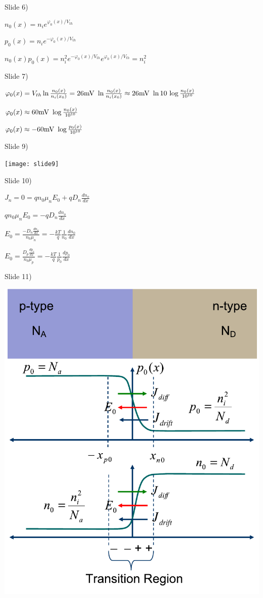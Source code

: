 \documentclass{beamer}
\begin{document}
 \begin{frame}{Slide 6)}

 ${n_0}(x) = {n_i}{e^{{\varphi _0}(x)/{V_{th}}}}$

 ${p_0}(x) = {n_i}{e^{ - {\varphi _0}(x)/{V_{th}}}}$

 ${n_0}(x){p_0}(x) = n_i^2{e^{ - {\varphi _0}(x)/{V_{th}}}}{e^{{\varphi _0}(x)/{V_{th}}}} = n_i^2$

 \end{frame}
 \begin{frame}{Slide 7)}

 ${\varphi _0}(x) = {V_{th}}\ln \frac{{{n_0}(x)}}{{{n_i}({x_0})}} = 26{\rm{mV}}\,\,\ln \frac{{{n_0}(x)}}{{{n_i}({x_0})}} \approx 26{\rm{mV}}\,\,\ln 10\,\log \frac{{{n_0}(x)}}{{{{10}^{10}}}}$

 ${\varphi _0}(x) \approx 60{\rm{mV}}\,\,\log \frac{{{n_0}(x)}}{{{{10}^{10}}}}$

 ${\varphi _0}(x) \approx  - 60{\rm{mV}}\,\,\log \frac{{{p_0}(x)}}{{{{10}^{10}}}}$


 \end{frame}
 \begin{frame}{Slide 9)}

 \texttt{[image: slide9]}

 \end{frame}

 \begin{frame}{Slide 10)}

 ${J_n} = 0 = q{n_0}{\mu _n}{E_0} + q{D_n}\frac{{d{n_o}}}{{dx}}$

 $q{n_0}{\mu _n}{E_0} =  - q{D_n}\frac{{d{n_o}}}{{dx}}$

 ${E_0} = \frac{{ - {D_n}\frac{{d{n_o}}}{{dx}}}}{{{n_0}{\mu _n}}} =  - \frac{{kT}}{q}\frac{1}{{{n_0}}}\frac{{d{n_0}}}{{dx}}$

 ${E_0} = \frac{{{D_p}\frac{{d{p_o}}}{{dx}}}}{{{n_0}{\mu _p}}} =  - \frac{{kT}}{q}\frac{1}{{{p_0}}}\frac{{d{p_0}}}{{dx}}$
 \end{frame}


 \begin{frame}{Slide 11)}

 \includegraphics[width=.6\columnwidth]{slide11}

 \end{frame}
\end{document}
